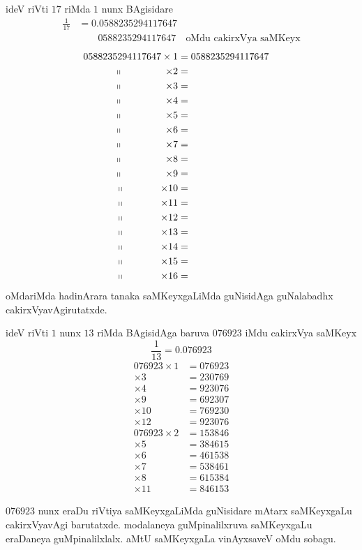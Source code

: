 ideV riVti $17$ riMda $1$ nunx BAgisidare
\begin{align*}
\frac{1}{17} &= 0.0588235294117647\\
&\qquad 0588235294117647 \quad\text{oMdu cakirxVya saMKeyx}
\end{align*}
\begin{align*}
0588235294117647 \times 1 &= 0588235294117647\\
~~~~~~\shortparallel ~~~~~~~~~~~~~ \times 2 &= &\\
~~~~~~\shortparallel ~~~~~~~~~~~~~\times 3 &= \\
~~~~~~\shortparallel ~~~~~~~~~~~~~\times 4 &= \\
~~~~~~\shortparallel ~~~~~~~~~~~~~\times 5 &= \\
~~~~~~\shortparallel ~~~~~~~~~~~~~\times 6 &= \\
~~~~~~\shortparallel ~~~~~~~~~~~~~\times 7 &= \\
~~~~~~\shortparallel ~~~~~~~~~~~~~\times 8 &= \\
~~~~~~\shortparallel ~~~~~~~~~~~~~\times 9 &= \\
~~~~~~\shortparallel ~~~~~~~~~~~\times 10 &= \\
~~~~~~\shortparallel ~~~~~~~~~~~\times 11 &= \\
~~~~~~\shortparallel ~~~~~~~~~~~\times  12&= \\
~~~~~~\shortparallel ~~~~~~~~~~~\times  13&= \\
~~~~~~\shortparallel ~~~~~~~~~~~\times  14&= \\
~~~~~~\shortparallel ~~~~~~~~~~~\times  15&= \\
~~~~~~\shortparallel ~~~~~~~~~~~\times  16&= 
\end{align*}
oMdariMda hadinArara tanaka saMKeyxgaLiMda guNisidAga guNalabadhx cakirxVyavAgirutatxde.

ideV riVti $1$ nunx $13$ riMda BAgisidAga baruva $076923$ iMdu cakirxVya saMKeyx
$$
\frac{1}{13} = 0.076923
$$
\begin{align*}
076923 \times 1 &= 076923 \\
       \times 3 &= 230769 \\ 
       \times 4 &= 923076 \\
       \times 9 &= 692307 \\ 
       \times 10 &= 769230 \\
       \times 12 &= 923076\\[5pt] 
076923 \times 2 &= 153846 \\
       \times 5 &= 384615 \\
       \times 6 &= 461538 \\
       \times 7 &= 538461 \\
       \times 8 &= 615384 \\
       \times 11 &= 846153 
\end{align*}

$076923$ nunx eraDu riVtiya saMKeyxgaLiMda guNisidare mAtarx saMKeyxgaLu cakirxVyavAgi barutatxde. modalaneya guMpinalilxruva saMKeyxgaLu eraDaneya guMpinalilxlalx. aMtU saMKeyxgaLa vinAyxsaveV oMdu sobagu.
